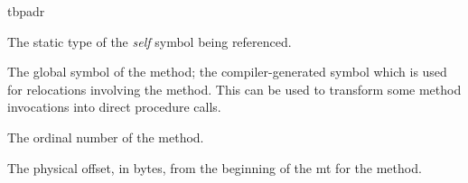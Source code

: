 \begin{instruction}{tbpadr}
\begin{operands}
  \item The static type of the \emph{self} symbol being referenced.

  \item The global symbol of the method; the compiler-generated symbol
    which is used for relocations involving the method.  This can be
    used to transform some method invocations into direct procedure
    calls.

  \item The ordinal number of the method.
  \item The physical offset, in bytes, from the beginning of the
    \ac{mt} for the method.
  \end{operands}

  \begin{seealso}
  \end{seealso}
\end{instruction}

